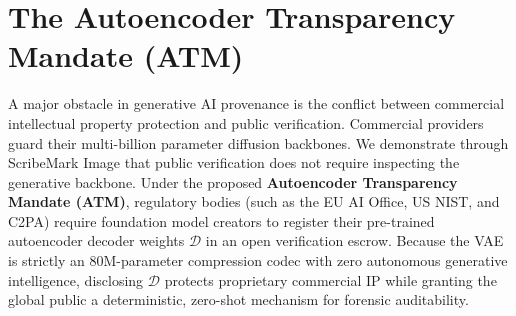 \documentclass[letterpaper]{article}
\begin{document}
\begin{table}[t]
\caption{Empirical Forensic Telemetry on $N=1,000$ Benchmark.}
\label{tab:metrics}
\centering
\small
{}
\end{table}

\section{The Autoencoder Transparency Mandate (ATM)}
\label{sec:atm}

A major obstacle in generative AI provenance is the conflict between commercial intellectual property protection and public verification. Commercial providers guard their multi-billion parameter diffusion backbones. We demonstrate through ScribeMark Image that public verification does not require inspecting the generative backbone. Under the proposed \textbf{Autoencoder Transparency Mandate (ATM)}, regulatory bodies (such as the EU AI Office, US NIST, and C2PA) require foundation model creators to register their pre-trained autoencoder decoder weights $\mathcal{D}$ in an open verification escrow. Because the VAE is strictly an $80\text{M}$-parameter compression codec with zero autonomous generative intelligence, disclosing $\mathcal{D}$ protects proprietary commercial IP while granting the global public a deterministic, zero-shot mechanism for forensic auditability.
\end{document}
